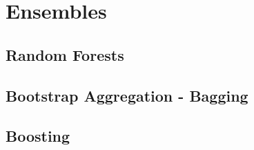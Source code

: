 \section{Ensembles}

\subsection{Random Forests}

\subsection{Bootstrap Aggregation - Bagging}

\subsection{Boosting}